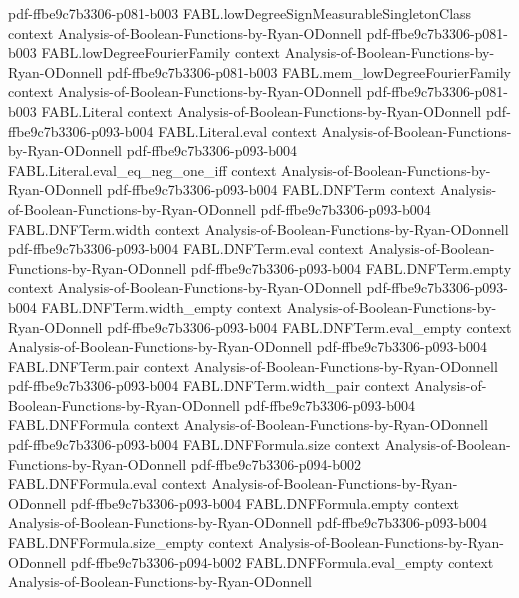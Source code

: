 \begin{theorem}
  {pdf-ffbe9c7b3306-p081-b003}
\proofstep
  {FABL.lowDegreeSignMeasurableSingletonClass}
  {context}
  {Analysis-of-Boolean-Functions-by-Ryan-ODonnell}
  {pdf-ffbe9c7b3306-p081-b003}
\proofstep
  {FABL.lowDegreeFourierFamily}
  {context}
  {Analysis-of-Boolean-Functions-by-Ryan-ODonnell}
  {pdf-ffbe9c7b3306-p081-b003}
\proofstep
  {FABL.mem_lowDegreeFourierFamily}
  {context}
  {Analysis-of-Boolean-Functions-by-Ryan-ODonnell}
  {pdf-ffbe9c7b3306-p081-b003}
\proofstep
  {FABL.Literal}
  {context}
  {Analysis-of-Boolean-Functions-by-Ryan-ODonnell}
  {pdf-ffbe9c7b3306-p093-b004}
\proofstep
  {FABL.Literal.eval}
  {context}
  {Analysis-of-Boolean-Functions-by-Ryan-ODonnell}
  {pdf-ffbe9c7b3306-p093-b004}
\proofstep
  {FABL.Literal.eval_eq_neg_one_iff}
  {context}
  {Analysis-of-Boolean-Functions-by-Ryan-ODonnell}
  {pdf-ffbe9c7b3306-p093-b004}
\proofstep
  {FABL.DNFTerm}
  {context}
  {Analysis-of-Boolean-Functions-by-Ryan-ODonnell}
  {pdf-ffbe9c7b3306-p093-b004}
\proofstep
  {FABL.DNFTerm.width}
  {context}
  {Analysis-of-Boolean-Functions-by-Ryan-ODonnell}
  {pdf-ffbe9c7b3306-p093-b004}
\proofstep
  {FABL.DNFTerm.eval}
  {context}
  {Analysis-of-Boolean-Functions-by-Ryan-ODonnell}
  {pdf-ffbe9c7b3306-p093-b004}
\proofstep
  {FABL.DNFTerm.empty}
  {context}
  {Analysis-of-Boolean-Functions-by-Ryan-ODonnell}
  {pdf-ffbe9c7b3306-p093-b004}
\proofstep
  {FABL.DNFTerm.width_empty}
  {context}
  {Analysis-of-Boolean-Functions-by-Ryan-ODonnell}
  {pdf-ffbe9c7b3306-p093-b004}
\proofstep
  {FABL.DNFTerm.eval_empty}
  {context}
  {Analysis-of-Boolean-Functions-by-Ryan-ODonnell}
  {pdf-ffbe9c7b3306-p093-b004}
\proofstep
  {FABL.DNFTerm.pair}
  {context}
  {Analysis-of-Boolean-Functions-by-Ryan-ODonnell}
  {pdf-ffbe9c7b3306-p093-b004}
\proofstep
  {FABL.DNFTerm.width_pair}
  {context}
  {Analysis-of-Boolean-Functions-by-Ryan-ODonnell}
  {pdf-ffbe9c7b3306-p093-b004}
\proofstep
  {FABL.DNFFormula}
  {context}
  {Analysis-of-Boolean-Functions-by-Ryan-ODonnell}
  {pdf-ffbe9c7b3306-p093-b004}
\proofstep
  {FABL.DNFFormula.size}
  {context}
  {Analysis-of-Boolean-Functions-by-Ryan-ODonnell}
  {pdf-ffbe9c7b3306-p094-b002}
\proofstep
  {FABL.DNFFormula.eval}
  {context}
  {Analysis-of-Boolean-Functions-by-Ryan-ODonnell}
  {pdf-ffbe9c7b3306-p093-b004}
\proofstep
  {FABL.DNFFormula.empty}
  {context}
  {Analysis-of-Boolean-Functions-by-Ryan-ODonnell}
  {pdf-ffbe9c7b3306-p093-b004}
\proofstep
  {FABL.DNFFormula.size_empty}
  {context}
  {Analysis-of-Boolean-Functions-by-Ryan-ODonnell}
  {pdf-ffbe9c7b3306-p094-b002}
\proofstep
  {FABL.DNFFormula.eval_empty}
  {context}
  {Analysis-of-Boolean-Functions-by-Ryan-ODonnell}

\end{theorem}
